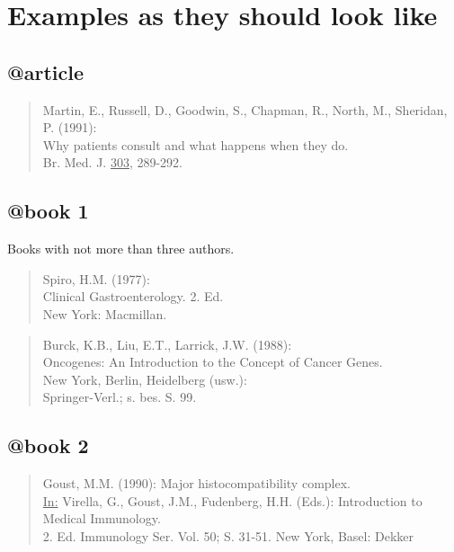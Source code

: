 \documentclass{article}
\begin{document}
\section{Examples as they should look like}

\subsection{@article}

\begin{quote}
Martin, E., Russell, D., Goodwin, S., Chapman, R., North, M., Sheridan, P. (1991):\\
Why patients consult and what happens when they do.\\
Br. Med. J. \underline{303}, 289-292.
\end{quote}

\subsection{@book 1}

Books with not more than three authors.

\begin{quote}
Spiro, H.M. (1977):\\
Clinical Gastroenterology. 2. Ed.\\
New York: Macmillan.
\end{quote}

\begin{quote}
Burck, K.B., Liu, E.T., Larrick, J.W. (1988):\\
Oncogenes: An Introduction to the Concept of Cancer Genes.\\
New York, Berlin, Heidelberg (usw.):\\
Springer-Verl.; s. bes. S. 99.
\end{quote}

\subsection{@book 2}

\begin{quote}
Goust, M.M. (1990): Major histocompatibility complex.\\
\underline{In:} Virella, G., Goust, J.M., Fudenberg, H.H. (Eds.): Introduction to Medical Immunology.\\
2. Ed. Immunology Ser. Vol. 50; S. 31-51. New York, Basel: Dekker
\end{quote}
\end{document}
